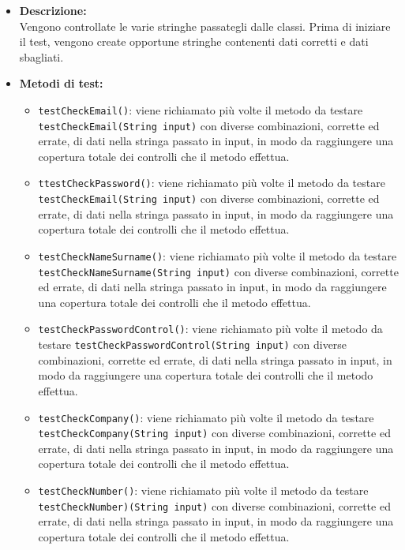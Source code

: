 {\begin{sloppypar}
{{\begin{itemize}
\begin{itemize}
					\item[] \textbf{Descrizione:} {\\Vengono controllate le varie stringhe passategli dalle classi.}
						Prima di iniziare il test, vengono create opportune stringhe contenenti dati corretti e dati sbagliati.
					
					\item[] \textbf{Metodi di test:}
					\begin{itemize}
						\item \texttt{testCheckEmail()}: viene richiamato più volte il metodo da testare \texttt{testCheckEmail(String input)} con diverse combinazioni, corrette ed errate, di dati nella stringa passato in input, in modo da raggiungere una copertura totale dei controlli che il metodo effettua.
						
						\item \texttt{ttestCheckPassword()}: viene richiamato più volte il metodo da testare \texttt{testCheckEmail(String input)} con diverse combinazioni, corrette ed errate, di dati nella stringa passato in input, in modo da raggiungere una copertura totale dei controlli che il metodo effettua.
						
						\item \texttt{testCheckNameSurname()}: viene richiamato più volte il metodo da testare \texttt{testCheckNameSurname(String input)} con diverse combinazioni, corrette ed errate, di dati nella stringa passato in input, in modo da raggiungere una copertura totale dei controlli che il metodo effettua.
						
						\item \texttt{testCheckPasswordControl()}: viene richiamato più volte il metodo da testare \texttt{testCheckPasswordControl(String input)} con diverse combinazioni, corrette ed errate, di dati nella stringa passato in input, in modo da raggiungere una copertura totale dei controlli che il metodo effettua.
						
						\item \texttt{testCheckCompany()}: viene richiamato più volte il metodo da testare \texttt{testCheckCompany(String input)} con diverse combinazioni, corrette ed errate, di dati nella stringa passato in input, in modo da raggiungere una copertura totale dei controlli che il metodo effettua.
						
						\item \texttt{testCheckNumber()}: viene richiamato più volte il metodo da testare \texttt{testCheckNumber)(String input)}  con diverse combinazioni, corrette ed errate, di dati nella stringa passato in input, in modo da raggiungere una copertura totale dei controlli che il metodo effettua.
					\end{itemize}


\end{itemize}
\end{itemize}}}
\end{sloppypar}}
